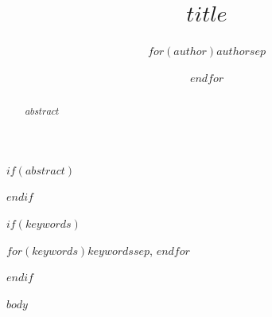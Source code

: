 \documentclass[conference]{IEEEtran}
\title{$title$}
\author{$for(author)$$author$$sep$ \and $endfor$}
\begin{document}
\maketitle

$if(abstract)$
\begin{abstract}
$abstract$
\end{abstract}
$endif$

$if(keywords)$
\begin{IEEEkeywords}
$for(keywords)$$keywords$$sep$, $endfor$
\end{IEEEkeywords}
$endif$

$body$
\end{document}
